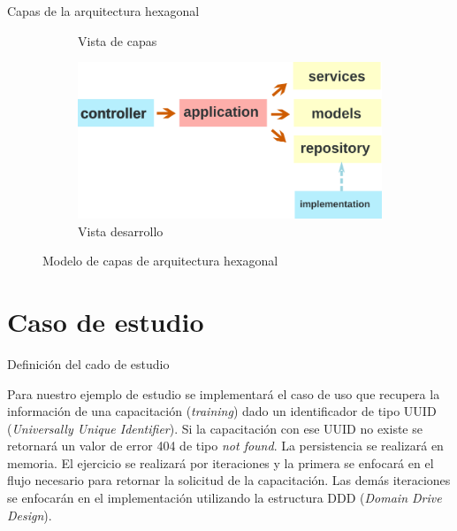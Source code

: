 \documentclass[10pt]{beamer}
\begin{document}
\begin{frame}[fragile]{Capas de la arquitectura hexagonal}
	
\begin{figure}[h!]
	\centering
	\begin{subfigure}[b]{0.3\linewidth}
		
				
		\caption{Vista de capas}
		\label{fig:vista_capas}
	\end{subfigure}
	\begin{subfigure}[b]{0.5\linewidth}
		\includegraphics[width=\linewidth]{img/g12805}
		
		\caption{Vista desarrollo}
		\label{fig:vista_desarrollo}
	\end{subfigure}
	\caption{Modelo de capas de arquitectura hexagonal}
	\label{fig:arq_hexagonal}
\end{figure}
	
\end{frame}


\section{Caso de estudio}

\begin{frame}{Definición del cado de estudio}

Para nuestro ejemplo de estudio se implementará el caso de uso que recupera la información de una capacitación (\emph{training}) dado un identificador de tipo UUID (\emph{Universally Unique Identifier}). Si la capacitación con ese UUID no existe se retornará un valor de error 404 de tipo \emph{not found}. La persistencia se realizará en memoria. El ejercicio se realizará por iteraciones y la primera se enfocará en el flujo necesario para retornar la solicitud de la capacitación. Las demás iteraciones se enfocarán en el implementación utilizando la estructura DDD (\emph{Domain Drive Design}).

\end{frame}
\end{document}
